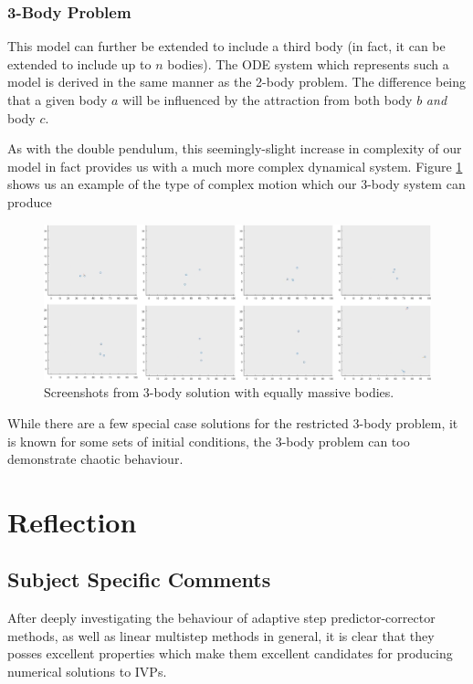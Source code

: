 \documentclass[12pt, twoside]{report}
\theoremstyle{plain}
\theoremstyle{definition}
\theoremstyle{definition}
\begin{document}
        \subsection{3-Body Problem}
        \label{5_3_body}
            This model can further be extended to include a third body (in fact, it can
            be extended to include up to $n$ bodies). The ODE system which represents such
            a model is derived in the same manner as the 2-body problem. The difference
            being that a given body $a$ will be influenced by the attraction from both body $b$
            \textit{and} body $c$. 

            As with the double pendulum, this seemingly-slight increase in complexity
            of our model in fact provides us with a much more complex dynamical system. 
            Figure \ref{3_body} shows us an example of the type of complex motion which 
            our 3-body system can produce

            \begin{figure}[H]
                \centering
                    \includegraphics[width=\columnwidth]{3-body}
                    \caption{Screenshots from 3-body solution with equally massive bodies.}
                    \label{3_body}
            \end{figure}

            While there are a few special case solutions for the restricted 3-body problem, 
            it is known for some sets of initial conditions, the 3-body problem 
            can too demonstrate chaotic behaviour. 

\chapter{Reflection}
\label{6_reflection}
    \section{Subject Specific Comments}
        After deeply investigating the behaviour of adaptive step predictor-corrector
        methods, as well as linear multistep methods in general, it is clear that they posses
        excellent properties which make them excellent candidates for producing numerical 
        solutions to IVPs. 
\end{document}
